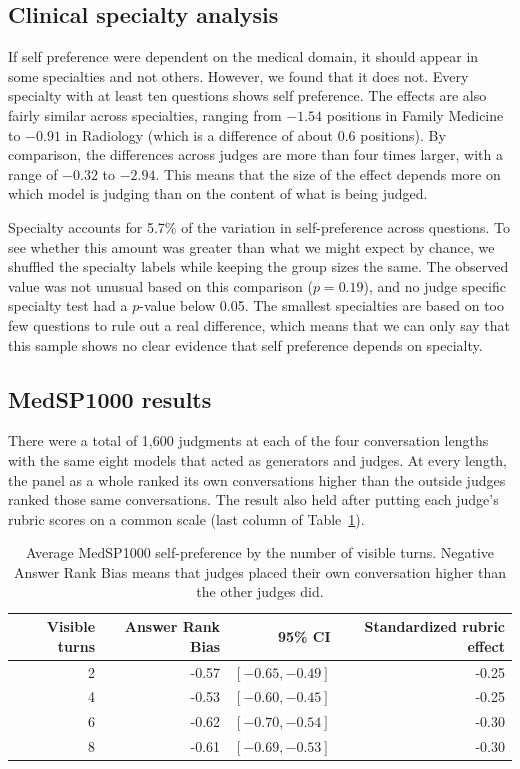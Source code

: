 \documentclass[11pt]{article}
\begin{document}
\subsection{Clinical specialty analysis}

If self preference were dependent on the medical domain, it should appear in some specialties and not others. However, we found that it does not. Every specialty with at least ten questions shows self preference. The effects are also fairly similar across specialties, ranging from $-1.54$ positions in Family Medicine to $-0.91$ in Radiology (which is a difference of about 0.6 positions). By comparison, the differences across judges are more than four times larger, with a range of $-0.32$ to $-2.94$. This means that the size of the effect depends more on which model is judging than on the content of what is being judged.

Specialty accounts for 5.7\% of the variation in self-preference across questions. To see whether this amount was greater than what we might expect by chance, we shuffled the specialty labels while keeping the group sizes the same. The observed value was not unusual based on this comparison ($p=0.19$), and no judge specific specialty test had a $p$-value below 0.05. The smallest specialties are based on too few questions to rule out a real difference, which means that we can only say that this sample shows no clear evidence that self preference depends on specialty.


\subsection{MedSP1000 results}

There were a total of 1,600 judgments at each of the four conversation lengths with the same eight models that acted as generators and judges. At every length, the panel as a whole
ranked its own conversations higher than the outside judges ranked those same
conversations. The result also held after putting each judge's rubric scores
on a common scale (last column of Table~\ref{tab:med-pooled}).

\begin{table}[htbp]
\centering
\small
\caption{Average MedSP1000 self-preference by the number of visible turns.
Negative Answer Rank Bias means that judges placed their own conversation higher
than the other judges did.}
\smallskip
\label{tab:med-pooled}
\begin{tabular}{rrrr}
\toprule
Visible turns & Answer Rank Bias & 95\% CI & Standardized rubric effect \\
\midrule
2 & -0.57 & $[-0.65,-0.49]$ & -0.25 \\
4 & -0.53 & $[-0.60,-0.45]$ & -0.25 \\
6 & -0.62 & $[-0.70,-0.54]$ & -0.30 \\
8 & -0.61 & $[-0.69,-0.53]$ & -0.30 \\
\bottomrule
\end{tabular}
\end{table}
\FloatBarrier
\end{document}
